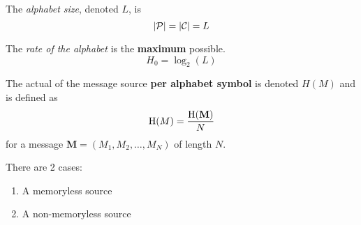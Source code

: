 \begin{definition}\label{def:Alphabet_Size}
  The \emph{alphabet size}, denoted $L$, is
  \begin{equation}\label{eq:Alphabet_Size}
    \lvert \operatorname{\mathcal{P}} \rvert = \lvert \operatorname{\mathcal{C}} \rvert = L
  \end{equation}
\end{definition}

\begin{definition}\label{def:Rate_of_Alphabet}
  The \emph{rate of the alphabet} is the \textbf{maximum } possible.
  \begin{equation}\label{eq:Rate_of_Alphabet}
    H_{0} = \log_{2} (L)
  \end{equation}
\end{definition}

\begin{definition}\label{def:Entropy_per_Alphabet_Symbol}
  The actual  of the message source \textbf{per alphabet symbol} is denoted $H(M)$ and is defined as
  \begin{equation}\label{eq:Entropy_per_Alphabet_Symbol}
    \operatorname{\operatorname{H}}(M) = \frac{\operatorname{\operatorname{H}}(\mathbf{M})}{N}
  \end{equation}
  for a message $\mathbf{M} = (M_{1}, M_{2}, \ldots, M_{N})$ of length $N$.

  \begin{remark}\label{rmk:Entropy_per_Alphabet_Symbol-Cases}
    There are 2 cases:
    \begin{enumerate}[noitemsep]
    \item A memoryless source
    \item A non-memoryless source
    \end{enumerate}
  \end{remark}
\end{definition}

